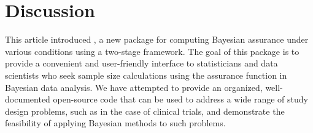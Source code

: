 \section{Discussion}
This article introduced ,
a new  package for computing Bayesian assurance under various conditions using a two-stage framework.  The goal of this package is to provide a convenient and user-friendly interface to statisticians and data scientists who seek sample size calculations using the assurance function in Bayesian data analysis. We have attempted to provide an organized, well-documented open-source code that can be used to address a wide range of study design problems, such as in the case of clinical trials, and demonstrate the feasibility
of applying Bayesian methods to such problems.





\address{Jane Pan\\
  University of California, Los Angeles\\
  650 Charles E Young Dr S, Los Angeles, CA 90095\\
  USA\\
  }

\address{Sudipto Banerjee\\
  University of California, Los Angeles\\
  650 Charles E Young Dr S, Los Angeles, CA 90095\\
  USA\\
  }
